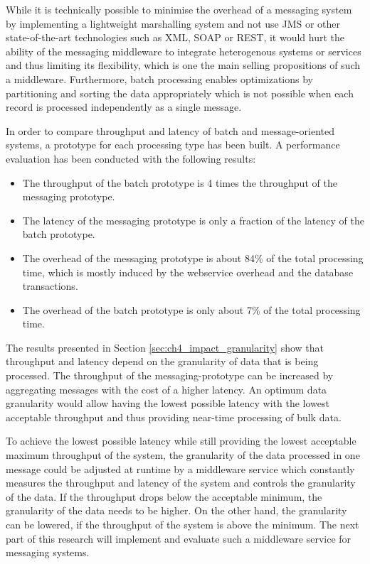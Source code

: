 While it is technically possible to minimise the overhead of a messaging system by implementing a lightweight marshalling system and not use JMS or other state-of-the-art technologies such as XML, SOAP or REST, it would hurt the ability of the messaging middleware to integrate heterogenous systems or services and thus limiting its flexibility, which is one the main selling propositions of such a middleware. Furthermore, batch processing enables optimizations by partitioning and sorting the data appropriately which is not possible when each record is processed independently as a single message.

In order to compare throughput and latency of batch and message-oriented systems, a prototype for each processing type has been built. A performance evaluation has been conducted with the following results:
\begin{itemize}
	\item The throughput of the batch prototype is 4 times the throughput of the messaging prototype.
	\item The latency of the messaging prototype is only a fraction of the latency of the batch prototype.
	\item The overhead of the messaging prototype is about 84\% of the total processing time, which is mostly induced by the webservice overhead and the database transactions. 
	\item The overhead of the batch prototype is only about 7\% of the total processing time.
\end{itemize}

The results presented in Section \ref{sec:ch4_impact_granularity} show that throughput and latency depend on the granularity of data that is being processed. The throughput of the messaging-prototype can be increased by aggregating messages with the cost of a higher latency. An optimum data granularity would allow having the lowest possible latency with the lowest acceptable throughput and thus providing near-time processing of bulk data.

To achieve the lowest possible latency while still providing the lowest acceptable maximum throughput of the system, the granularity of the data processed in one message could be adjusted at runtime by a middleware service which constantly measures the throughput and latency of the system and controls the granularity of the data. If the throughput drops below the acceptable minimum, the granularity of the data needs to be higher. On the other hand, the granularity can be lowered, if the throughput of the system is above the minimum. The next part of this research will implement and evaluate such a middleware service for messaging systems.